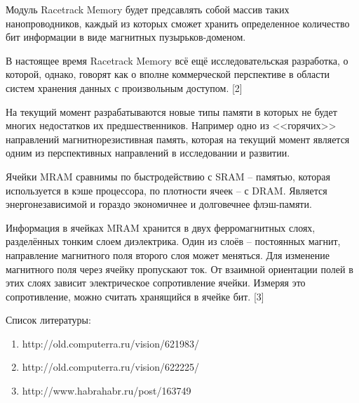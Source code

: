 Модуль Racetrack Memory будет предсавлять собой массив таких 
нанопроводников, каждый из которых сможет хранить определенное количество 
бит информации в виде магнитных пузырьков-доменом. 

В настоящее время Racetrack Memory всё ещё исследовательская разработка, 
о которой, однако, говорят как о вполне коммерческой перспективе в области 
систем хранения данных с произвольным доступом. [2]

На текущий момент разрабатываются новые типы памяти в которых не будет 
многих недостатков их предшественников. Например одно из <<горячих>> 
направлений магнитнорезистивная память, которая на текущий момент 
является одним из перспективных направлений в исследовании и развитии.

Ячейки MRAM сравнимы по быстродействию с SRAM -- памятью, которая 
используется в кэше процессора, по плотности ячеек -- с DRAM. Является 
энергонезависимой и гораздо экономичнее и долговечнее флэш-памяти.

Информация в ячейках MRAM хранится в двух ферромагнитных слоях, 
разделённых тонким слоем диэлектрика. Один из слоёв -- постоянных магнит, 
направление магнитного поля второго слоя может меняться. Для изменение 
магнитного поля через ячейку пропускают ток. От взаимной ориентации полей 
в этих слоях зависит электрическое сопротивление ячейки. Измеряя это 
сопротивление, можно считать хранящийся в ячейке бит. [3]

\pagebreak

Список литературы:
\begin{enumerate}
	\item http://old.computerra.ru/vision/621983/
	\item http://old.computerra.ru/vision/622225/
	\item http://www.habrahabr.ru/post/163749
\end{enumerate} 


